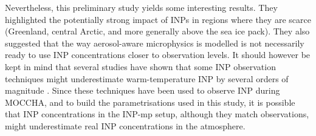 Nevertheless, this preliminary study yields some interesting results.
They highlighted the potentially strong impact of INPs in regions where they are scarce (Greenland, central Arctic, and more generally above the sea ice pack). 
They also suggested that the way aerosol-aware microphysics is modelled is not necessarily ready to use INP concentrations closer to observation levels. 
It should however be kept in mind that several studies have shown that some INP observation techniques might underestimate warm-temperature INP by several orders of magnitude \citep{emersic_investigating_2015, hiranuma_comprehensive_2015}. 
Since these techniques have been used to observe INP during MOCCHA, and to build the parametrisations used in this study, it is possible that INP concentrations in the INP-mp setup, although they match observations, might underestimate real INP concentrations in the atmosphere. %
%
%
\vspace{\baselineskip}

